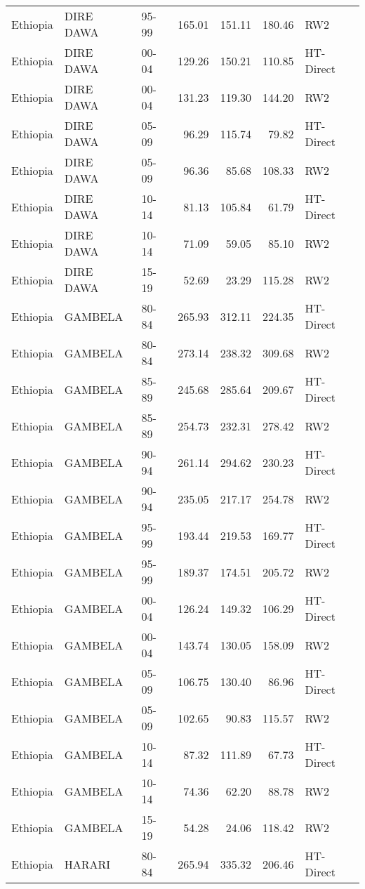 \begin{longtable}{lllrrrl}
  Ethiopia & DIRE DAWA & 95-99 & 165.01 & 151.11 & 180.46 & RW2 \\ 
  Ethiopia & DIRE DAWA & 00-04 & 129.26 & 150.21 & 110.85 & HT-Direct \\ 
  Ethiopia & DIRE DAWA & 00-04 & 131.23 & 119.30 & 144.20 & RW2 \\ 
  Ethiopia & DIRE DAWA & 05-09 & 96.29 & 115.74 & 79.82 & HT-Direct \\ 
  Ethiopia & DIRE DAWA & 05-09 & 96.36 & 85.68 & 108.33 & RW2 \\ 
  Ethiopia & DIRE DAWA & 10-14 & 81.13 & 105.84 & 61.79 & HT-Direct \\ 
  Ethiopia & DIRE DAWA & 10-14 & 71.09 & 59.05 & 85.10 & RW2 \\ 
  Ethiopia & DIRE DAWA & 15-19 & 52.69 & 23.29 & 115.28 & RW2 \\ 
  Ethiopia & GAMBELA & 80-84 & 265.93 & 312.11 & 224.35 & HT-Direct \\ 
  Ethiopia & GAMBELA & 80-84 & 273.14 & 238.32 & 309.68 & RW2 \\ 
  Ethiopia & GAMBELA & 85-89 & 245.68 & 285.64 & 209.67 & HT-Direct \\ 
  Ethiopia & GAMBELA & 85-89 & 254.73 & 232.31 & 278.42 & RW2 \\ 
  Ethiopia & GAMBELA & 90-94 & 261.14 & 294.62 & 230.23 & HT-Direct \\ 
  Ethiopia & GAMBELA & 90-94 & 235.05 & 217.17 & 254.78 & RW2 \\ 
  Ethiopia & GAMBELA & 95-99 & 193.44 & 219.53 & 169.77 & HT-Direct \\ 
  Ethiopia & GAMBELA & 95-99 & 189.37 & 174.51 & 205.72 & RW2 \\ 
  Ethiopia & GAMBELA & 00-04 & 126.24 & 149.32 & 106.29 & HT-Direct \\ 
  Ethiopia & GAMBELA & 00-04 & 143.74 & 130.05 & 158.09 & RW2 \\ 
  Ethiopia & GAMBELA & 05-09 & 106.75 & 130.40 & 86.96 & HT-Direct \\ 
  Ethiopia & GAMBELA & 05-09 & 102.65 & 90.83 & 115.57 & RW2 \\ 
  Ethiopia & GAMBELA & 10-14 & 87.32 & 111.89 & 67.73 & HT-Direct \\ 
  Ethiopia & GAMBELA & 10-14 & 74.36 & 62.20 & 88.78 & RW2 \\ 
  Ethiopia & GAMBELA & 15-19 & 54.28 & 24.06 & 118.42 & RW2 \\ 
  Ethiopia & HARARI & 80-84 & 265.94 & 335.32 & 206.46 & HT-Direct \\ 

\end{longtable}
